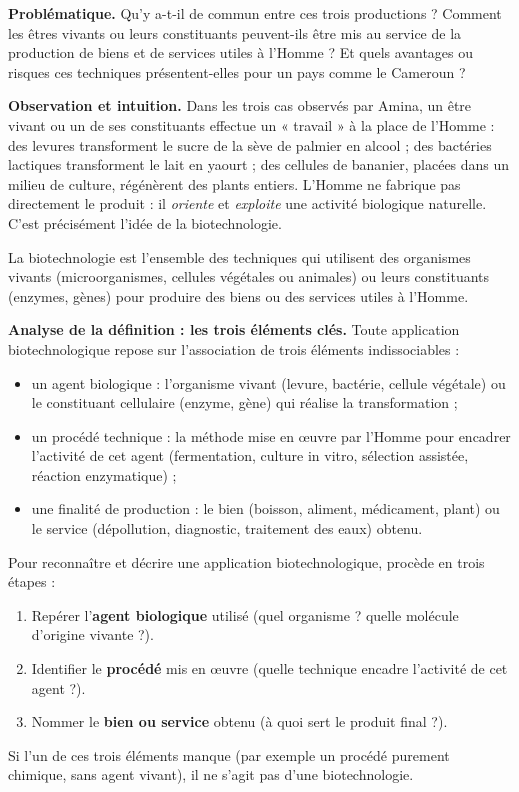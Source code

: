 \documentclass[11pt]{article}
\newcommand{\cle}[1]{{\popxbold\color{popdark}#1}}
\newcounter{popsec}
\newcounter{popsub}
\newcommand{\courssub}[1]{%
  \stepcounter{popsub}%
  \par\vspace{9pt}\noindent{\popxbold\fontsize{11.5}{13}\selectfont\color{popink}{\color{poporange}\thepopsec.\thepopsub}\hspace{6pt}#1}\par\nopagebreak\vspace{4pt}
}
\begin{document}
\textbf{Problématique.} Qu'y a-t-il de commun entre ces trois productions ? Comment les êtres vivants ou leurs constituants peuvent-ils être mis au service de la production de biens et de services utiles à l'Homme ? Et quels avantages ou risques ces techniques présentent-elles pour un pays comme le Cameroun ?

\courssub{Qu'est-ce que la biotechnologie ?}

\textbf{Observation et intuition.} Dans les trois cas observés par Amina, un être vivant ou un de ses constituants effectue un « travail » à la place de l'Homme : des levures transforment le sucre de la sève de palmier en alcool ; des bactéries lactiques transforment le lait en yaourt ; des cellules de bananier, placées dans un milieu de culture, régénèrent des plants entiers. L'Homme ne fabrique pas directement le produit : il \emph{oriente} et \emph{exploite} une activité biologique naturelle. C'est précisément l'idée de la biotechnologie.

\begin{definition}[Biotechnologie]
La \cle{biotechnologie} est l'ensemble des techniques qui utilisent des organismes vivants (microorganismes, cellules végétales ou animales) ou leurs constituants (enzymes, gènes) pour produire des \cle{biens} ou des \cle{services} utiles à l'Homme.
\end{definition}

\textbf{Analyse de la définition : les trois éléments clés.} Toute application biotechnologique repose sur l'association de trois éléments indissociables :

\begin{itemize}
\item un \cle{agent biologique} : l'organisme vivant (levure, bactérie, cellule végétale) ou le constituant cellulaire (enzyme, gène) qui réalise la transformation ;
\item un \cle{procédé technique} : la méthode mise en œuvre par l'Homme pour encadrer l'activité de cet agent (fermentation, culture in vitro, sélection assistée, réaction enzymatique) ;
\item une \cle{finalité de production} : le bien (boisson, aliment, médicament, plant) ou le service (dépollution, diagnostic, traitement des eaux) obtenu.
\end{itemize}

\begin{methode}
Pour reconnaître et décrire une application biotechnologique, procède en trois étapes :
\begin{enumerate}
\item Repérer l'\textbf{agent biologique} utilisé (quel organisme ? quelle molécule d'origine vivante ?).
\item Identifier le \textbf{procédé} mis en œuvre (quelle technique encadre l'activité de cet agent ?).
\item Nommer le \textbf{bien ou service} obtenu (à quoi sert le produit final ?).
\end{enumerate}
Si l'un de ces trois éléments manque (par exemple un procédé purement chimique, sans agent vivant), il ne s'agit pas d'une biotechnologie.
\end{methode}
\end{document}
